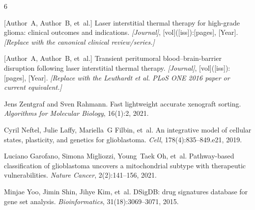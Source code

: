 \documentclass[unnumsec,webpdf,contemporary,large]{oup-authoring-template}
\begin{document}
\begin{thebibliography}{6}

[Author~A, Author~B, et~al.]
\newblock Laser interstitial thermal therapy for high-grade glioma: clinical outcomes and indications.
\newblock \emph{[Journal]}, [vol]([iss]):[pages], [Year]. \emph{[Replace with the canonical clinical review/series.]}

[Author~A, Author~B, et~al.]
\newblock Transient peritumoral blood--brain-barrier disruption following laser interstitial thermal therapy.
\newblock \emph{[Journal]}, [vol]([iss]):[pages], [Year]. \emph{[Replace with the Leuthardt et al. PLoS ONE 2016 paper or current equivalent.]}

Jens Zentgraf and Sven Rahmann.
\newblock Fast lightweight accurate xenograft sorting.
\newblock \emph{Algorithms for Molecular Biology}, 16(1):2, 2021.

Cyril Neftel, Julie Laffy, Mariella~G Filbin, et~al.
\newblock An integrative model of cellular states, plasticity, and genetics for glioblastoma.
\newblock \emph{Cell}, 178(4):835--849.e21, 2019.

Luciano Garofano, Simona Migliozzi, Young~Taek Oh, et~al.
\newblock Pathway-based classification of glioblastoma uncovers a mitochondrial subtype with therapeutic vulnerabilities.
\newblock \emph{Nature Cancer}, 2(2):141--156, 2021.

Minjae Yoo, Jimin Shin, Jihye Kim, et~al.
\newblock DSigDB: drug signatures database for gene set analysis.
\newblock \emph{Bioinformatics}, 31(18):3069--3071, 2015.

\end{thebibliography}
\end{document}
